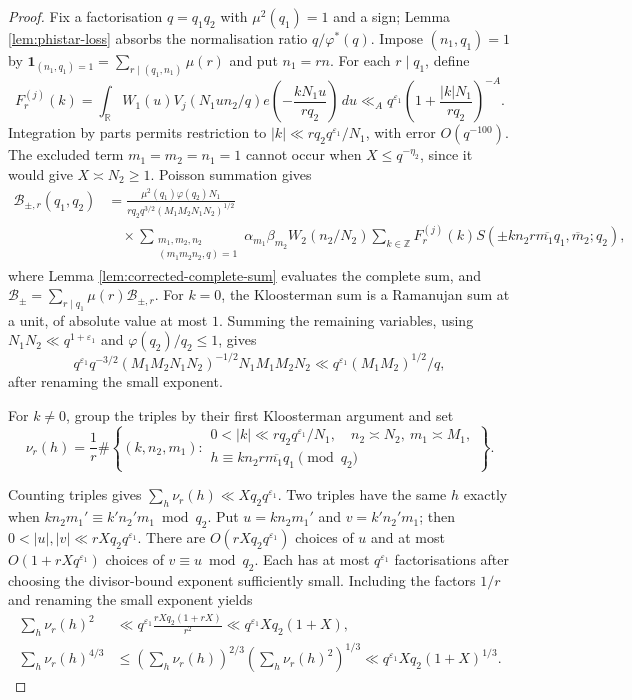 \documentclass[12pt, a4paper]{amsart}
\numberwithin{equation}{section}
\newcommand{\e}{e}
\newcommand{\Z}{\mathbb{Z}}
\newcommand{\R}{\mathbb{R}}
\renewcommand{\bar}[1]{\overline{#1}}
\renewcommand{\le}{\leqslant}
\renewcommand{\ge}{\geqslant}
\theoremstyle{plain}
\begin{document}
\begin{proof}
Fix a factorisation $q=q_1q_2$ with $\mu^2(q_1)=1$ and a sign; Lemma \ref{lem:phistar-loss} absorbs the normalisation ratio $q/\varphi^*(q)$. Impose $(n_1,q_1)=1$ by $\mathbf 1_{(n_1,q_1)=1}=\sum_{r\mid(q_1,n_1)}\mu(r)$ and put $n_1=rn$. For each $r\mid q_1$, define
$$
F_r^{(j)}(k)=
\int_{\R}
W_1(u)V_j(N_1un_2/q)
\e\left(-\frac{kN_1u}{rq_2}\right)\,du
\ll_A q^{\varepsilon_1}
\left(1+\frac{|k|N_1}{rq_2}\right)^{-A}.
$$
Integration by parts permits restriction to $|k|\ll rq_2q^{\varepsilon_1}/N_1$, with error $O(q^{-100})$. The excluded term $m_1=m_2=n_1=1$ cannot occur when $X\le q^{-\eta_2}$, since it would give $X\asymp N_2\ge1$. Poisson summation gives
\begin{equation}\label{eq:poisson-block}
\begin{aligned}
\mathcal B_{\pm,r}(q_1,q_2)
&=
\frac{\mu^2(q_1)\varphi(q_2)N_1}{rq_2q^{3/2}(M_1M_2N_1N_2)^{1/2}}\\
&\quad\times
\sum_{\substack{m_1,m_2,n_2\\ (m_1m_2n_2,q)=1}}
\alpha_{m_1}\beta_{m_2}
W_2(n_2/N_2)
\sum_{k\in\Z}F_r^{(j)}(k)
S(\pm kn_2\overline{rm_1q_1},\bar m_2;q_2),
\end{aligned}
\end{equation}
where Lemma \ref{lem:corrected-complete-sum} evaluates the complete sum, and $\mathcal B_\pm=\sum_{r\mid q_1}\mu(r)\mathcal B_{\pm,r}$. For $k=0$, the Kloosterman sum is a Ramanujan sum at a unit, of absolute value at most $1$. Summing the remaining variables, using $N_1N_2\ll q^{1+\varepsilon_1}$ and $\varphi(q_2)/q_2\le1$, gives
$$
q^{\varepsilon_1}q^{-3/2}(M_1M_2N_1N_2)^{-1/2}N_1M_1M_2N_2\ll q^{\varepsilon_1}(M_1M_2)^{1/2}/q,
$$
after renaming the small exponent.

For $k\ne0$, group the triples by their first Kloosterman argument and set
$$
\nu_r(h)=
\frac1r\#\left\{(k,n_2,m_1):
\begin{array}{l}
0<|k|\ll rq_2q^{\varepsilon_1}/N_1,\quad n_2\asymp N_2,\ m_1\asymp M_1,\\
h\equiv kn_2\overline{rm_1q_1}\pmod{q_2}
\end{array}\right\}.
$$

Counting triples gives $\sum_h\nu_r(h)\ll Xq_2q^{\varepsilon_1}$. Two triples have the same $h$ exactly when $kn_2m_1'\equiv k'n_2'm_1\bmod q_2$. Put $u=kn_2m_1'$ and $v=k'n_2'm_1$; then $0<|u|,|v|\ll rXq_2q^{\varepsilon_1}$. There are $O(rXq_2q^{\varepsilon_1})$ choices of $u$ and at most $O(1+rXq^{\varepsilon_1})$ choices of $v\equiv u\bmod q_2$. Each has at most $q^{\varepsilon_1}$ factorisations after choosing the divisor-bound exponent sufficiently small. Including the factors $1/r$ and renaming the small exponent yields
$$
\begin{aligned}
\sum_h\nu_r(h)^2
&\ll q^{\varepsilon_1}\frac{rXq_2(1+rX)}{r^2}
\ll q^{\varepsilon_1}Xq_2(1+X),\\
\sum_h\nu_r(h)^{4/3}
&\le
\left(\sum_h\nu_r(h)\right)^{2/3}
\left(\sum_h\nu_r(h)^2\right)^{1/3}
\ll q^{\varepsilon_1} Xq_2(1+X)^{1/3}.
\end{aligned}
$$


\end{proof}
\end{document}
